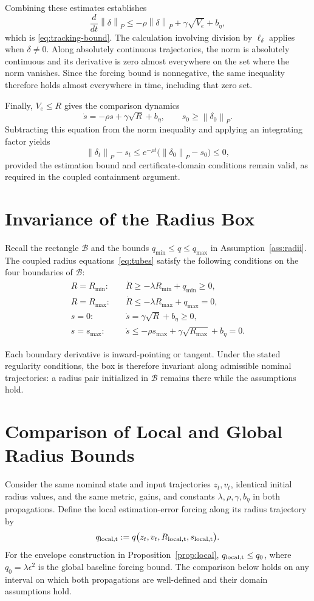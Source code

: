 \documentclass[11pt,a4paper]{article}
\numberwithin{equation}{section}
\theoremstyle{remark}\newtheorem{remark}{Remark}
\newcommand{\norm}[1]{\left\lVert#1\right\rVert}
\begin{document}
Combining these estimates establishes
\begin{equation}
\frac{d}{dt}\norm\delta_P
\le-\rho\norm\delta_P+\gamma\sqrt{V_e}+b_\eta,
\end{equation}
which is \eqref{eq:tracking-bound}. The calculation involving division by $\ell_\delta$ applies when $\delta\ne0$. Along absolutely continuous trajectories, the norm is absolutely continuous and its derivative is zero almost everywhere on the set where the norm vanishes. Since the forcing bound is nonnegative, the same inequality therefore holds almost everywhere in time, including that zero set.

Finally, $V_e\le R$ gives the comparison dynamics
\[
\dot s=-\rho s+\gamma\sqrt R+b_\eta,
\qquad s_{0}\ge\norm{\delta_{0}}_P.
\]
Subtracting this equation from the norm inequality and applying an integrating factor yields
\[
\norm{\delta_{t}}_P-s_{t}
\le e^{-\rho t}\bigl(\norm{\delta_{0}}_P-s_{0}\bigr)\le0,
\]
provided the estimation bound and certificate-domain conditions remain valid, as required in the coupled containment argument.

\section{Invariance of the Radius Box}\label{app:radius-box}
Recall the rectangle $\mathcal B$ and the bounds $q_{\min}\le q\le q_{\max}$ in Assumption~\ref{ass:radii}.
The coupled radius equations~\eqref{eq:tubes} satisfy the following conditions on the four boundaries of $\mathcal B$:
\[
\begin{aligned}
R=R_{\min}:\quad &\dot R\ge-\lambda R_{\min}+q_{\min}\ge0,\\
R=R_{\max}:\quad &\dot R\le-\lambda R_{\max}+q_{\max}=0,\\
s=0:\quad &\dot s=\gamma\sqrt R+b_\eta\ge0,\\
s=s_{\max}:\quad &\dot s\le-\rho s_{\max}+\gamma\sqrt{R_{\max}}+b_\eta=0.
\end{aligned}
\]

Each boundary derivative is inward-pointing or tangent. Under the stated regularity conditions, the box is therefore invariant along admissible nominal trajectories: a radius pair initialized in $\mathcal B$ remains there while the assumptions hold.
\section{Comparison of Local and Global Radius Bounds}\label{app:radius-comparison}
Consider the same nominal state and input trajectories $z_{t},v_{t}$, identical initial radius values, and the same metric, gains, and constants $\lambda,\rho,\gamma,b_\eta$ in both propagations. Define the local estimation-error forcing along its radius trajectory by
\[
q_{\rm local,t}:=q\bigl(z_{t},v_{t},R_{\rm local,t},s_{\rm local,t}\bigr).
\]
For the envelope construction in Proposition~\ref{prop:local}, $q_{\rm local,t}\le q_0$, where $q_0=\lambda\epsilon^2$ is the global baseline forcing bound. The comparison below holds on any interval on which both propagations are well-defined and their domain assumptions hold.
\end{document}
